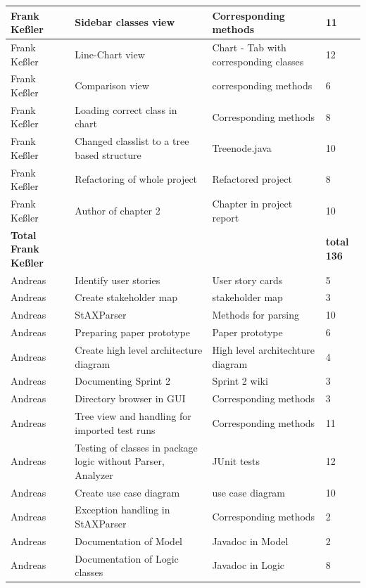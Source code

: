 \begin{longtable}{|p{}||p{}|p{}|p{}|}
    \hline
    Frank Keßler & Sidebar classes view & Corresponding methods & 11 \\ 
    \hline
    Frank Keßler & Line-Chart view & Chart - Tab with corresponding classes & 12 \\ 
    \hline
    Frank Keßler & Comparison view & corresponding methods & 6\\
    \hline
    Frank Keßler & Loading correct class in chart & Corresponding methods & 8 \\ 
    \hline
    Frank Keßler & Changed classlist to a tree based structure & Treenode.java & 10 \\ 
    \hline
    Frank Keßler & Refactoring of whole project & Refactored project & 8 \\ 
    \hline
    Frank Keßler & Author of chapter 2 & Chapter in project report & 10 \\ 
    \hline
    \hline 
    \textbf{Total \newline Frank Keßler} & & & \textbf{total 136}   \\
    \hline
    \hline
    Andreas & Identify user stories & User story cards & 5 \\
    \hline
    Andreas & Create stakeholder map & stakeholder map & 3 \\ 
    \hline
    Andreas & StAXParser & Methods for parsing & 10 \\ 
    \hline
    Andreas & Preparing paper prototype & Paper prototype & 6 \\
    \hline
    Andreas & Create high level architecture diagram & High level architechture diagram & 4 \\ 
    \hline
    Andreas & Documenting Sprint 2 & Sprint 2 wiki & 3 \\ 
    \hline 
    Andreas & Directory browser in GUI & Corresponding methods & 3 \\ 
    \hline
    Andreas & Tree view and handling for imported test runs & Corresponding methods & 11 \\ 
    \hline
    Andreas & Testing of classes in package logic without Parser, Analyzer & JUnit tests & 12 \\ 
    \hline 
    Andreas & Create use case diagram & use case diagram & 10 \\ 
    \hline
    Andreas & Exception handling in StAXParser & Corresponding methods & 2 \\ 
    \hline
    Andreas & Documentation of Model & Javadoc in Model & 2 \\ 
    \hline
    Andreas & Documentation of Logic classes & Javadoc in Logic & 8 \\ 

\end{longtable}
